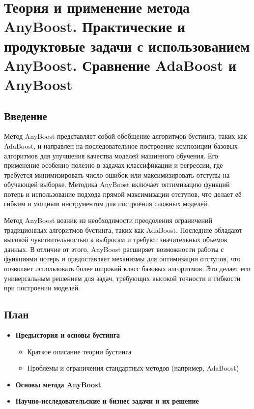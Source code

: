 \section*{Теория и применение метода AnyBoost. Практические и продуктовые задачи с использованием AnyBoost. Сравнение AdaBoost и AnyBoost}
\subsection*{Введение}
Метод AnyBoost представляет собой обобщение алгоритмов бустинга, таких как AdaBoost, и направлен на последовательное построение композиции базовых алгоритмов для улучшения качества моделей машинного обучения. Его применение особенно полезно в задачах классификации и регрессии, где требуется минимизировать число ошибок или максимизировать отступы на обучающей выборке. Методика AnyBoost включает оптимизацию функций потерь и использование подхода прямой максимизации отступов, что делает её гибким и мощным инструментом для построения сложных моделей.

Метод AnyBoost возник из необходимости преодоления ограничений традиционных алгоритмов бустинга, таких как AdaBoost. Последние обладают высокой чувствительностью к выбросам и требуют значительных объемов данных. В отличие от этого, AnyBoost расширяет возможности работы с функциями потерь и предоставляет механизмы для оптимизации отступов, что позволяет использовать более широкий класс базовых алгоритмов. Это делает его универсальным решением для задач, требующих высокой точности и гибкости при построении моделей.

\subsection*{План}

\begin{itemize}
    \item \textbf{Предыстория и основы бустинга}
          \begin{itemize}
              \item Краткое описание теории бустинга
              \item Проблемы и ограничения стандартных методов (например, AdaBoost)
          \end{itemize}
    \item \textbf{Основы метода AnyBoost}
    \item \textbf{Научно-исследовательские и бизнес задачи и их решение}
\end{itemize}

